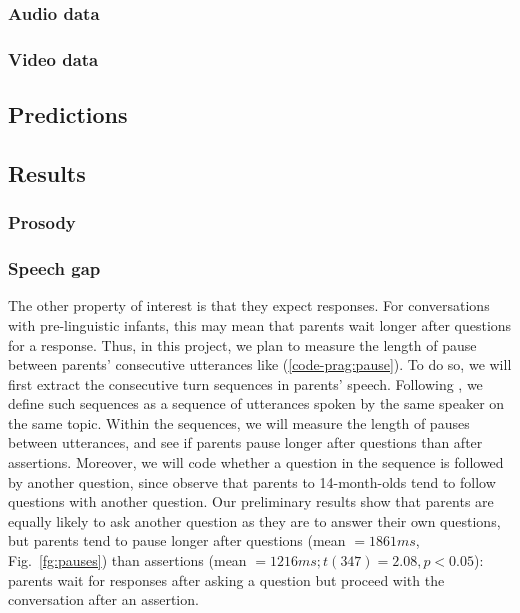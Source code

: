 \label{sec:engsp:corpus:uttgoals}
\subsubsection{Audio data}
\label{sec:engsp:corpus:audio}
\subsubsection{Video data}
\label{sec:engsp:corpus:video}


\subsection{Predictions}
\label{sec:engsp:predictions}

\subsection{Results}
\label{sec:engsp:results}



\subsubsection{Prosody}
\label{sec:engsp:results:prosody}

\subsubsection{Speech gap}
\label{sec:engsp:results:pause}

The other property of interest is that they expect responses. For conversations with pre-linguistic infants, this may mean that parents wait longer after questions for a response. Thus, in this project, we plan to measure the length of pause between parents’ consecutive utterances like (\ref{code-prag:pause}). To do so, we will first extract the consecutive turn sequences in parents’ speech. Following \cite{reimchen2017}, we define such sequences as a sequence of utterances spoken by the same speaker on the same topic. Within the sequences, we will measure the length of pauses between utterances, and see if parents pause longer after questions than after assertions. Moreover, we will code whether a question in the sequence is followed by another question, since \cite{reimchen2017} observe that parents to 14-month-olds tend to follow questions with another question. Our preliminary results show that parents are equally likely to ask another question as they are to answer their own questions, but parents tend to pause longer after questions (mean $= 1861ms$, Fig.~\ref{fg:pauses}) than assertions (mean $= 1216ms; t(347) = 2.08, p <0.05$): parents wait for responses after asking a question but proceed with the conversation after an assertion. 




